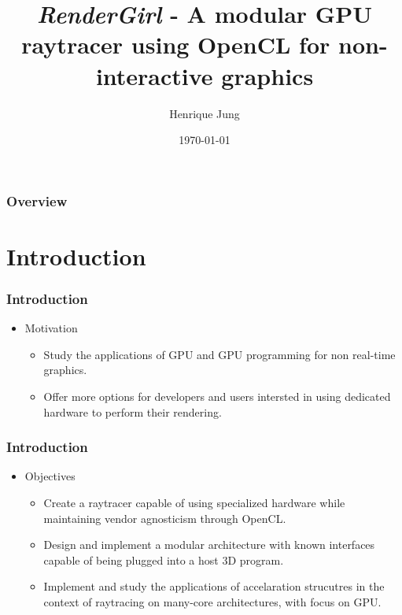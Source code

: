 \documentclass{beamer}
\title[RenderGirl]{\emph{RenderGirl} - A modular GPU raytracer using OpenCL for non-interactive graphics}
\author{Henrique Jung}
\institute[Unisinos]
{
Universidade do Vale do Rio dos Sinos \\
\medskip
\textit{henriquenj@gmail.com}
}
\date{\today}
\begin{document}
\begin{frame}
\titlepage %
\end{frame}

\begin{frame}
\frametitle{Overview}
\tableofcontents
\end{frame}

\section{Introduction}

\begin{frame}
\frametitle{Introduction}

\begin{itemize}
\item Motivation

\begin{itemize}
\item Study the applications of GPU and GPU programming for non
  real-time graphics.
\item Offer more options for developers and users intersted in using
  dedicated hardware to perform their rendering.
\end{itemize}

\end{itemize}

\frametitle{Introduction}

\begin{itemize}
\item Objectives
\begin{itemize}
\item Create a raytracer capable of using specialized hardware while
  maintaining vendor agnosticism through OpenCL.
\item Design and implement a modular architecture with known
  interfaces capable of being plugged into a host 3D program.
\item Implement and study the applications of accelaration strucutres
  in the context of raytracing on many-core architectures, with focus
  on GPU.
\end{itemize}
\end{itemize}

\end{frame}
\end{document}
